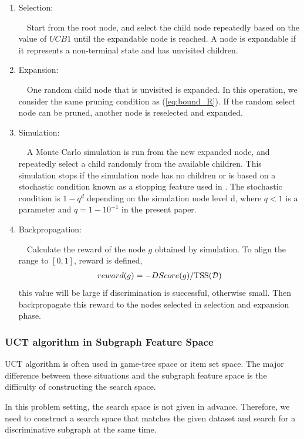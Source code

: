 \begin{enumerate}
	\item{Selection}:

	~~Start from the root node, and select the child node repeatedly 
	based on the value of $UCB1$ until the expandable node is reached.
	A node is expandable if it represents a non-terminal state and has unvisited children.

	\item{Expansion}:

	~~One random child node that is unvisited is expanded.
	In this operation, we consider the same pruning condition as (\ref{eq:bound_R}). 
	If the random select node can be pruned, another node is reselected and expanded.

	\item{Simulation}:
	
	~~A Monte Carlo simulation is run from the new expanded node,
	and repeatedly select a child randomly from the available children.
	This simulation stops if the simulation node has no children or 
	is based on a stochastic condition known as a stopping feature used in \cite{Romaric:2010}.
	The stochastic condition is $1 - q^{d}$ depending on the simulation node level d,
	where $q < 1$ is a parameter and $q = 1 - 10^{-1}$ in the present paper.
	
	\item{Backpropagation}:

	~~Calculate the reward of the node $g$ obtained by simulation.
	To align the range to $[0, 1]$, reward is defined, 
	\begin{eqnarray}
		reward(g) = -DScore(g) / \mathrm{TSS}(\mathcal{D})
	\end{eqnarray}
	this value will be large if discrimination is successful, otherwise small.
	Then backpropagate this reward to the nodes selected in selection and expansion phase.
\end{enumerate}

\subsubsection*{UCT algorithm in Subgraph Feature Space}
UCT algorithm is often used in game-tree space or item set space.
The major difference between these situations 
and the subgraph feature space is the difficulty of constructing the search space.

In this problem setting, the search space is not given in advance.
Therefore, we need to construct a search space that matches the given dataset 
and search for a discriminative subgraph at the same time.

